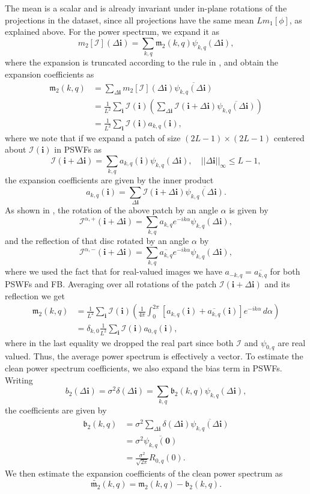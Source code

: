 \documentclass[english,11pt]{article}
\newcommand{\1}{\mathbf{1}}
\newcommand{\II}{\mathcal{I}}
\newcommand{\mb}{\mathbf}
\newcommand{\mk}{\mathfrak}
\numberwithin{equation}{section}
\theoremstyle{plain}
\theoremstyle{definition}
\theoremstyle{remark}
\theoremstyle{plain}
\theoremstyle{remark}
\theoremstyle{plain}
\theoremstyle{plain}
\begin{document}
The mean is a scalar and is already invariant under in-plane rotations of the projections in the dataset, since all projections have the same mean $Lm_1[\phi]$, as explained above. For the power spectrum, we expand it as
\[ m_2[\II](\Delta\mb i) =
\sum_{k,q}\mathfrak{m}_2(k,q)\psi_{k,q}(\Delta\mb i),\]
where the expansion is truncated according to the rule in \cite{landa2017steerable}, and obtain the expansion coefficients as
\[\begin{aligned} 
\mathfrak{m}_2(k,q) &=
\sum_{\Delta\mb i}m_2[\II](\Delta\mb i)\overline{\psi_{k,q}(\Delta\mb i)}\\
&=
\frac{1}{L^2}\sum_{\mb i}\II(\mb i)\left(\sum_{\Delta\mb i}\II(\mb i+\Delta\mb i)\overline{\psi_{k,q}(\Delta\mb i)}\right)\\
&= \frac{1}{L^2}\sum_{\mb i}\II(\mb i)a_{k,q}(\mb i), \end{aligned}\]
where we note that if we expand a patch of size $(2L-1) \times (2L-1)$ centered about $\II(\mb i)$ in PSWFs as
\[ \II(\mb i + \Delta\mb i) = \sum_{k,q}a_{k,q}(\mb i)\psi_{k,q}(\Delta\mb i),\quad ||\Delta\mb i||_{\infty}\leq L-1,\]
the expansion coefficients are given by the inner product
\[ a_{k,q}(\mb i) = \sum_{\Delta\mb i}\II(\mb i + \Delta\mb i)\overline{\psi_{k,q}(\Delta\mb i)}.\]
As shown in \cite{landa2017steerable, zhao2016fast}, the rotation of the above patch by an angle $\alpha$ is given by
\[ \II^{\alpha,+}(\mb i+\Delta\mb i) = \sum_{k,q}a_{k,q}e^{-ik\alpha}\psi_{k,q}(\Delta\mb i),\]
and the reflection of that disc rotated by an angle $\alpha$ by
\[ \II^{\alpha,-}(\mb i+\Delta\mb i) = \sum_{k,q}\overline{a_{k,q}}e^{-ik\alpha}\psi_{k,q}(\Delta\mb i),\]
where we used the fact that for real-valued images we have $a_{-k,q}=\overline{a_{k,q}}$ for both PSWFs and FB. Averaging over all rotations of the patch $\II(\mb i + \Delta\mb i)$ and its reflection we get
\[\begin{aligned} 
\mathfrak{m}_2(k,q) &= \frac{1}{L^2}\sum_{\mb i}\II(\mb i)\left(\frac{1}{4\pi}\int_0^{2\pi}[a_{k,q}(\mb i) +
\overline{a_{k,q}}(\mb i)]e^{-ik\alpha}\, d\alpha\right)\\ 
&= \delta_{k,0} \frac{1}{L^2}\sum_{\mb i}\II(\mb i)a_{0,q}(\mb i), \end{aligned}\]
where in the last equality we dropped the real part since both
$\II$ and $\psi_{0,q}$ are real valued.
Thus, the average power spectrum is effectively a vector. To estimate the clean power spectrum coefficients, we also expand the bias term in PSWFs. Writing
\[ b_2(\Delta\mb i) = \sigma^2\delta(\Delta\mb i) = \sum_{k,q}\mathfrak{b}_2(k,q)\psi_{k,q}(\Delta\mb i),\]
the coefficients are given by
\[\begin{aligned} 
\mathfrak{b}_2(k,q) &= \sigma^2\sum_{\Delta\mb i}\delta(\Delta\mb i)\overline{\psi_{k,q}(\Delta\mb i)}\\
&= \sigma^2\overline{\psi_{k,q}(\mb 0)}\\
&= \frac{\sigma^2}{\sqrt{2\pi}}R_{0,q}(0). \end{aligned}\]
We then estimate the expansion coefficients of the clean power spectrum as
\[ \widetilde{\mk m_2}(k,q) = \mk m_2(k,q) - \mk b_2(k,q).\]
\end{document}
